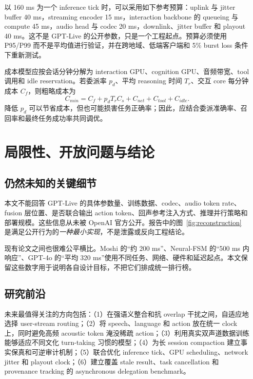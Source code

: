 以 160 ms 为一个 inference tick 时，可以采用如下参考预算：uplink 与 jitter buffer 40 ms，streaming encoder 15 ms，interaction backbone 的 queueing 与 compute 45 ms，audio head 与 codec 20 ms，downlink、jitter buffer 和 playout 40 ms。这不是 GPT-Live 的公开参数，只是一个工程起点。预算必须使用 P95/P99 而不是平均值进行验证，并在跨地域、低端客户端和 5\% burst loss 条件下重新测试。

成本模型应按会话分钟分解为 interaction GPU、cognition GPU、音频带宽、tool 调用和 idle reservation。若委派率 $p_d$、平均 reasoning 时间 $T_r$、交互 core 每分钟成本 $C_f$，则粗略成本为
\begin{equation}
C_{min}=C_f+p_dT_rC_s+C_{net}+C_{tool}+C_{idle}.
\end{equation}
降低 $p_d$ 可以节省成本，但也可能损害任务正确率；因此，应结合委派准确率、召回率和最终任务成功率共同调优。

\section{局限性、开放问题与结论}

\subsection{仍然未知的关键细节}

本文不能回答 GPT-Live 的具体参数量、训练数据、codec、audio token rate、fusion 层位置、是否联合输出 action token、回声参考注入方式、推理并行策略和部署规模。这些信息从未被 OpenAI 官方公开。报告中的图~\ref{fig:reconstruction} 是满足公开行为的\emph{一种最小实现}，不是泄露或反向工程结论。

现有论文之间也很难公平横比。Moshi 的“约 200 ms”、Neural-FSM 的“500 ms 内响应”、GPT-4o 的“平均 320 ms”使用不同任务、网络、硬件和延迟起点。本文保留这些数字用于说明各自设计目标，不把它们排成统一排行榜。

\subsection{研究前沿}

未来最值得关注的方向包括：（1）在强语义整合和抗 overlap 干扰之间，自适应地选择 user-stream routing；（2）将 speech、language 和 action 放在统一 clock 上，同时避免高频 acoustic token 淹没稀疏 action；（3）利用真实双声道数据训练能够适应不同文化 turn-taking 习惯的模型；（4）为长 session compaction 建立事实保真和可逆审计机制；（5）联合优化 inference tick、GPU scheduling、network jitter 和 playout clock；（6）建立覆盖 stale result、task cancellation 和 provenance tracking 的 asynchronous delegation benchmark。

